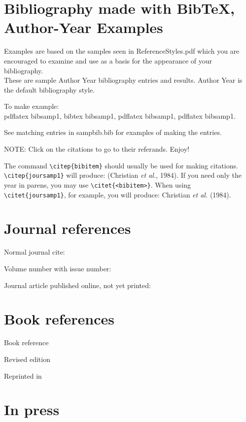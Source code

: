 \documentclass[preprint]{JASA}
\begin{document}
\section*{Bibliography made with BibTeX, Author-Year Examples}

Examples are based on the samples seen in ReferenceStyles.pdf which you
are encouraged to examine and use as a basis for the appearance of
your bibliography.\\
These are sample Author Year bibliography entries and results.
Author Year is the default bibliography style.

To make example:\\
 pdflatex bibsamp1, bibtex bibsamp1, pdflatex bibsamp1, pdflatex
 bibsamp1.

See matching entries in sampbib.bib for examples of making the entries.

NOTE: Click on the citations to go to their referands. Enjoy!

The command \verb+\citep{bibitem}+ should usually be used for making
citations. \verb+\citep{joursamp1}+ will produce: (Christian {\it et
al.}, 1984). If you need only the year in parens, you may use
\verb+\citet{<bibitem>}+. When using \verb+\citet{joursamp1}+, for
example, you will produce: Christian {\it et al.} (1984).

\section*{Journal references}

Normal journal cite: \citep{joursamp1}

Volume number with issue number: \citep{joursamp3}


Journal article published online, not yet printed: \citep[published
online]{sampMisc2}

\section*{Book references}

Book reference \citep{booksamp1}

Revised edition \citep{booksamp4}

Reprinted in \citep{sampReprint2}

\section*{In press}

\citep[in press]{inpress2}
\end{document}
